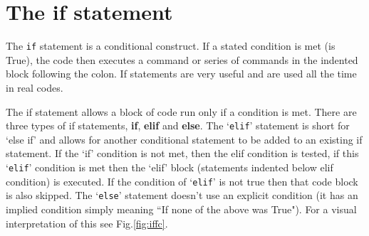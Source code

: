


\section{The if statement}
The {\tt if} statement is a conditional construct. If a stated condition is met (is True), the code then executes a command or series of commands in the indented block following the colon. If statements are very useful and are used all the time in real codes.

\noindent The if statement allows a block of code run only if a condition is met. There are three types of if statements, \textbf{if}, \textbf{elif} and \textbf{else}. The `{\tt elif}' statement is short for `else if'  and allows for another conditional statement to be added to an existing if statement. If the `if' condition is not met, then the elif condition is tested, if this `{\tt elif}' condition is met then the `elif' block (statements indented below elif condition) is executed. If the condition of `{\tt elif}' is not true then that code block is also skipped.  The `{\tt else}' statement doesn't use an explicit condition (it has an implied condition simply meaning ``If none of the above was True"). For a visual interpretation of this see Fig.\ref{fig:iffc}.\\

